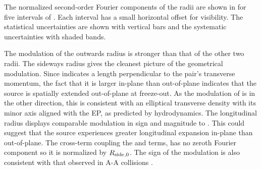 The normalized second-order Fourier components of the radii are shown in \Fig{\ref{fig:Rosl_vs_q2}} for five intervals of \kt.
Each \kt interval has a small horizontal offset for visibility.
The statistical uncertainties are shown with vertical bars and the systematic uncertainties with shaded bands.

The modulation of the outwards radius \Rout is stronger than that of the other two radii.
The sideways radius \Rside gives the cleanest picture of the geometrical modulation. Since \Rside indicates a length perpendicular to the pair's transverse momentum, the fact that it is larger in-plane than out-of-plane indicates that the source is spatially extended out-of-plane at freeze-out. As the modulation of \Rout is in the other direction, this is consistent with an elliptical transverse density with its minor axis aligned with the EP, as predicted by hydrodynamics.
The longitudinal radius \Rlong displays comparable modulation in sign and magnitude to \Rside. This could suggest that the source experiences greater longitudinal expansion in-plane than out-of-plane.
The cross-term coupling the \Rout and \Rside terms, \Ros has no zeroth Fourier component so it is normalized by $R_{\mathrm{side}}{}_{,0}$. The sign of the modulation is also consistent with that observed in A-A collisions \cite{Adams:2003ra,Adare:2014vax,Adamczyk:2014mxp,Adamova:2017opl}.

